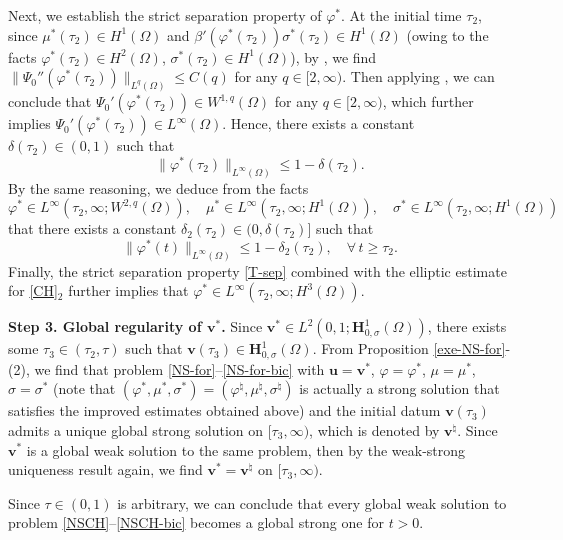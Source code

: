 \documentclass[11pt,reqno]{amsart}
\def\uu{\bm{u}}
\def\vv{\bm{v}}
\begin{document}
Next, we establish the strict separation property of $\varphi^*$. At the initial time $\tau_2$, since $\mu^*({\tau_2})\in H^1(\Omega)$ and $\beta'(\varphi^*(\tau_2))\sigma^*(\tau_2)\in H^1(\Omega)$ (owing to the facts $\varphi^*(\tau_2)\in H^2(\Omega)$, $\sigma^*(\tau_2)\in H^1(\Omega)$), by \cite[Lemma 7.4]{GiGrWu2018}, we find $\|\Psi_0''(\varphi^*(\tau_2))\|_{L^q(\Omega)} \leq C(q)$ for any $q\in [2,\infty)$.
Then applying \cite[Lemma 3.2]{HW}, we can conclude that $\Psi_0'(\varphi^*(\tau_2)) \in W^{1,q}(\Omega)$ for any $q\in[2,\infty)$, which further implies $\Psi_0'(\varphi^*(\tau_2))\in L^\infty(\Omega)$. Hence, there exists a constant $\delta(\tau_2)\in (0,1)$ such that
%
\begin{equation}
\|\varphi^*(\tau_2)\|_{L^{\infty}(\Omega)} \leq 1-\delta(\tau_2).
\label{inisep}
\end{equation}
%
By the same reasoning, we deduce from the facts $$\varphi^* \in L^\infty(\tau_2,\infty;W^{2,q}(\Omega)),\quad \mu^* \in L^{\infty}(\tau_2,\infty; H^1(\Omega)),\quad \sigma^* \in L^{\infty}(\tau_2,\infty;H^1(\Omega))
$$
that
there exists a constant $\delta_2(\tau_2)\in (0,\delta(\tau_2)]$ such that
%
\begin{equation}
\|\varphi^*(t)\|_{L^{\infty}(\Omega)} \leq 1-\delta_2(\tau_2),\quad
\forall\, t\geq \tau_2.
\label{T-sep}
\end{equation}
%
Finally, the strict separation property \eqref{T-sep} combined with the elliptic estimate for \eqref{CH}$_2$ further implies that $
\varphi^*\in L^\infty(\tau_2,\infty;H^3(\Omega))$.
\smallskip

\textbf{Step 3. Global regularity of $\vv^*$.}
Since $\vv^*\in L^2(0,1;\bm{H}^1_{0,\sigma}(\Omega))$, there exists some $\tau_3\in (\tau_2,\tau)$ such that $\vv(\tau_3)\in \bm{H}^1_{0,\sigma}(\Omega)$.  From Proposition \ref{exe-NS-for}-(2), we find that problem \eqref{NS-for}--\eqref{NS-for-bic} with $\uu=\vv^*$, $\varphi=\varphi^*$, $\mu=\mu^*$, $\sigma=\sigma^*$ (note that $(\varphi^*, \mu^*, \sigma^*)= (\varphi^\natural, \mu^\natural, \sigma^\natural)$  is actually a strong solution that satisfies the improved estimates obtained above) and the initial datum $\vv(\tau_3)$ admits a unique global strong solution on $[\tau_3,\infty)$, which is denoted by $\vv^\natural$. Since $\vv^*$ is a global weak solution to the same problem, then by the weak-strong uniqueness result again, we find $\vv^*=\vv^\natural$ on $[\tau_3,\infty)$.
\smallskip

Since $\tau\in (0,1)$ is arbitrary, we can conclude that every global weak solution to problem \eqref{NSCH}--\eqref{NSCH-bic} becomes a global strong one for $t>0$.
\end{document}
